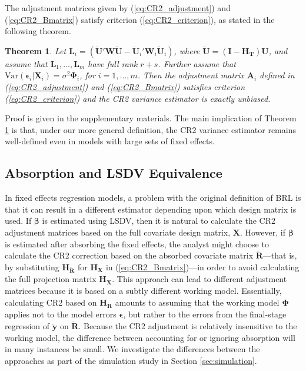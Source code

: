 \documentclass[12pt]{article}
\newtheorem{thm}{Theorem}
\begin{document}
The adjustment matrices given by (\ref{eq:CR2_adjustment}) and
(\ref{eq:CR2_Bmatrix}) satisfy criterion (\ref{eq:CR2_criterion}), as
stated in the following theorem.

\begin{thm}
\label{thm:BRL_FE}
Let $\mathbf{L}_i = \left(\mathbf{\ddot{U}}'\mathbf{W}\mathbf{\ddot{U}} - \mathbf{\ddot{U}}_i'\mathbf{W}_i\mathbf{\ddot{U}}_i\right)$, where $\mathbf{\ddot{U}} = \left(\mathbf{I} - \mathbf{H_T}\right)\mathbf{U}$, and assume that $\mathbf{L}_1,...,\mathbf{L}_m$ have full rank $r + s$. Further assume that $\text{Var}\left(\boldsymbol\epsilon_i\left|\mathbf{X}_i\right.\right) = \sigma^2 \boldsymbol\Phi_i$, for $i = 1,...,m$. Then the adjustment matrix $\mathbf{A}_i$ defined in (\ref{eq:CR2_adjustment}) and (\ref{eq:CR2_Bmatrix}) satisfies criterion (\ref{eq:CR2_criterion}) and the CR2 variance estimator is exactly unbiased.
\end{thm}

Proof is given in the supplementary materials. The main implication of
Theorem \ref{thm:BRL_FE} is that, under our more general definition, the
CR2 variance estimator remains well-defined even in models with large
sets of fixed effects.

\hypertarget{absorption-and-lsdv-equivalence}{%
\subsection{Absorption and LSDV
Equivalence}\label{absorption-and-lsdv-equivalence}}

In fixed effects regression models, a problem with the original
definition of BRL is that it can result in a different estimator
depending upon which design matrix is used. If \(\boldsymbol\beta\) is
estimated using LSDV, then it is natural to calculate the CR2 adjustment
matrices based on the full covariate design matrix, \(\mathbf{X}\).
However, if \(\boldsymbol\beta\) is estimated after absorbing the fixed
effects, the analyst might choose to calculate the CR2 correction based
on the absorbed covariate matrix \(\mathbf{\ddot{R}}\)---that is, by
substituting \(\mathbf{H_{\ddot{R}}}\) for \(\mathbf{H_X}\) in
(\ref{eq:CR2_Bmatrix})---in order to avoid calculating the full
projection matrix \(\mathbf{H_X}\). This approach can lead to different
adjustment matrices because it is based on a subtly different working
model. Essentially, calculating CR2 based on \(\mathbf{H_{\ddot{R}}}\)
amounts to assuming that the working model \(\boldsymbol\Phi\) applies
not to the model errors \(\boldsymbol\epsilon\), but rather to the
errors from the final-stage regression of \(\mathbf{\ddot{y}}\) on
\(\mathbf{\ddot{R}}\). Because the CR2 adjustment is relatively
insensitive to the working model, the difference between accounting for
or ignoring absorption will in many instances be small. We investigate
the differences between the approaches as part of the simulation study
in Section \ref{sec:simulation}.
\end{document}
